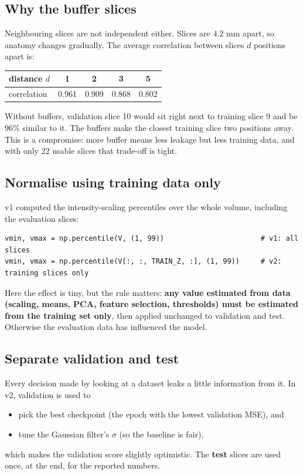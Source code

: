 \documentclass[11pt,a4paper]{article}
\begin{document}
\subsection{Why the buffer slices}

Neighbouring slices are not independent either. Slices are 4.2 mm apart, so anatomy changes
gradually. The average correlation between slices $d$ positions apart is:

\begin{center}
\begin{tabular}{lcccc}
  \toprule
  distance $d$ & 1 & 2 & 3 & 5 \\
  \midrule
  correlation & 0.961 & 0.909 & 0.868 & 0.802 \\
  \bottomrule
\end{tabular}
\end{center}

Without buffers, validation slice 10 would sit right next to training slice 9 and be 96\% similar to it.
The buffers make the closest training slice two positions away. This is a compromise: more buffer means less
leakage but less training data, and with only 22 usable slices that trade-off is tight.

\subsection{Normalise using training data only}

v1 computed the intensity-scaling percentiles over the whole volume, including the evaluation slices:

\begin{lstlisting}
vmin, vmax = np.percentile(V, (1, 99))                       # v1: all slices
vmin, vmax = np.percentile(V[:, :, TRAIN_Z, :], (1, 99))     # v2: training slices only
\end{lstlisting}

Here the effect is tiny, but the rule matters: \textbf{any value estimated from data (scaling, means, PCA,
feature selection, thresholds) must be estimated from the training set only}, then applied unchanged to
validation and test. Otherwise the evaluation data has influenced the model.

\subsection{Separate validation and test}

Every decision made by looking at a dataset leaks a little information from it. In v2, validation is used to
\begin{itemize}[nosep]
  \item pick the best checkpoint (the epoch with the lowest validation MSE), and
  \item tune the Gaussian filter's $\sigma$ (so the baseline is fair),
\end{itemize}
which makes the validation score slightly optimistic. The \textbf{test} slices are used once, at the end,
for the reported numbers.
\end{document}
